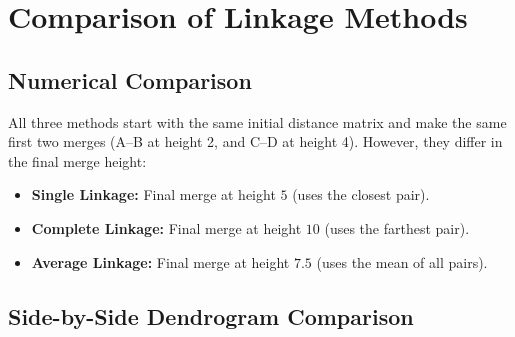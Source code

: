 \documentclass{article}
\begin{document}
\section{Comparison of Linkage Methods}

\subsection{Numerical Comparison}

All three methods start with the same initial distance matrix and make the same first two merges (A--B at height 2, and C--D at height 4). However, they differ in the final merge height:

\begin{itemize}
    \item \textbf{Single Linkage:} Final merge at height $5$ (uses the closest pair).
    \item \textbf{Complete Linkage:} Final merge at height $10$ (uses the farthest pair).
    \item \textbf{Average Linkage:} Final merge at height $7.5$ (uses the mean of all pairs).
\end{itemize}

\subsection{Side-by-Side Dendrogram Comparison}
\end{document}
